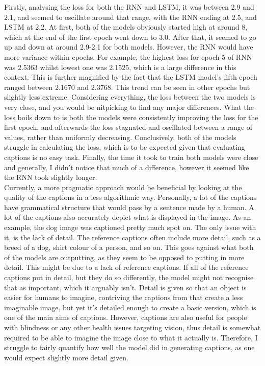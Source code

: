 \documentclass{article}
\begin{document}
    Firstly, analysing the loss for both the RNN and LSTM, it was between 2.9 and 2.1, and seemed to oscillate around that range, with the RNN ending at 2.5, and LSTM at 2.2. At first, both of the models obviously started high at around 8, which at the end of the first epoch went down to 3.0. After that, it seemed to go up and down at around 2.9-2.1 for both models. However, the RNN would have more variance within epochs. For example, the highest loss for epoch 5 of RNN was 2.5363 whilst lowest one was 2.1525, which is a large difference in this context. This is further magnified by the fact that the LSTM model's fifth epoch ranged between 2.1670 and 2.3768. This trend can be seen in other epochs but slightly less extreme. Considering everything, the loss between the two models is very close, and you would be nitpicking to find any major differences. What the loss boils down to is both the models were consistently improving the loss for the first epoch, and afterwards the loss stagnated and oscillated between a range of values, rather than uniformly decreasing. Conclusively, both of the models struggle in calculating the loss, which is to be expected given that evaluating captions is no easy task. Finally, the time it took to train both models were close and generally, I didn't notice that much of a difference, however it seemed like the RNN took slightly longer.\\
    
    Currently, a more pragmatic approach would be beneficial by looking at the quality of the captions in a less algorithmic way. Personally, a lot of the captions have grammatical structure that would pass by a sentence made by a human. A lot of the captions also accurately depict what is displayed in the image. As an example, the dog image was captioned pretty much spot on. The only issue with it, is the lack of detail. The reference captions often include more detail, such as a breed of a dog, shirt colour of a person, and so on. This goes against what both of the models are outputting, as they seem to be opposed to putting in more detail. This might be due to a lack of reference captions. If all of the reference captions put in detail,  but they do so differently, the model might not recognise that as important, which it arguably isn't. Detail is given so that an object is easier for humans to imagine, contriving the captions from that create a less imaginable image, but yet it's detailed enough to create a basic version, which is one of the main aims of captions. However, captions are also useful for people with blindness or any other health issues targeting vision, thus detail is somewhat required to be able to imagine the image close to what it actually is. Therefore, I struggle to fairly quantify how well the model did in generating captions, as one would expect slightly more detail given.\\ 
\end{document}
